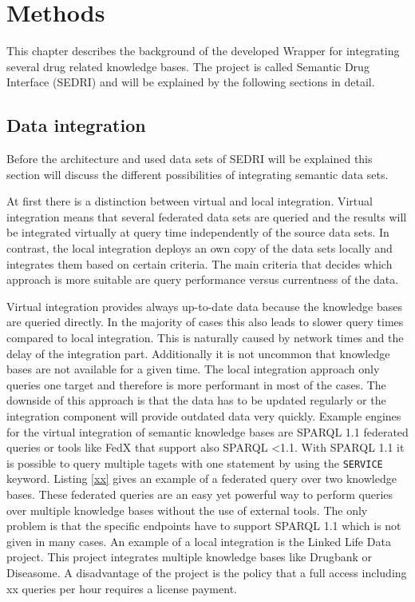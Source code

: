 \chapter{Methods}
\label{cha:methods}

This chapter describes the background of the developed Wrapper for integrating several drug related knowledge bases.
The project is called Semantic Drug Interface (SEDRI) and will be explained by the following sections in detail.

\section{Data integration}
\label{sec:data-integration}

Before the architecture and used data sets of SEDRI will be explained this section will discuss the different possibilities of integrating semantic data sets.

At first there is a distinction between virtual and local integration.
Virtual integration means that several federated data sets are queried and the results will be integrated virtually at query time independently of the source data sets.
In contrast, the local integration deploys an own copy of the data sets locally and integrates them based on certain criteria.
The main criteria that decides which approach is more suitable are query performance versus currentness of the data.

Virtual integration provides always up-to-date data because the knowledge bases are queried directly.
In the majority of cases this also leads to slower query times compared to local integration.
This is naturally caused by network times and the delay of the integration part.
Additionally it is not uncommon that knowledge bases are not available for a given time.
The local integration approach only queries one target and therefore is more performant in most of the cases.
The downside of this approach is that the data has to be updated regularly or the integration component will provide outdated data very quickly.
Example engines for the virtual integration of semantic knowledge bases are SPARQL 1.1 federated queries or tools like FedX that support also SPARQL <1.1.
With SPARQL 1.1 it is possible to query multiple tagets with one statement by using the \texttt{SERVICE} keyword.
Listing \ref{xx} gives an example of a federated query over two knowledge bases.
These federated queries are an easy yet powerful way to perform queries over multiple knowledge bases without the use of external tools.
The only problem is that the specific endpoints have to support SPARQL 1.1 which is not given in many cases.
An example of a local integration is the Linked Life Data project.
This project integrates multiple knowledge bases like Drugbank or Diseasome.
A disadvantage of the project is the policy that a full access including xx queries per hour requires a license payment.


